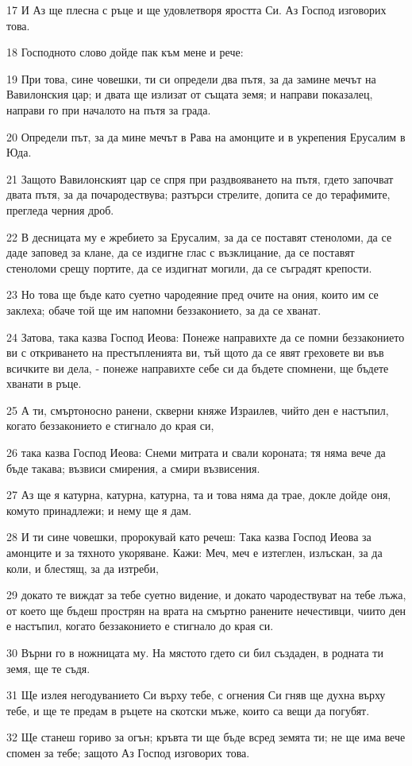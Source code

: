 \par 17 И Аз ще плесна с ръце и ще удовлетворя яростта Си. Аз Господ изговорих това.
\par 18 Господното слово дойде пак към мене и рече:
\par 19 При това, сине човешки, ти си определи два пътя, за да замине мечът на Вавилонския цар; и двата ще излизат от същата земя; и направи показалец, направи го при началото на пътя за града.
\par 20 Определи път, за да мине мечът в Рава на амонците и в укрепения Ерусалим в Юда.
\par 21 Защото Вавилонският цар се спря при раздвояването на пътя, гдето започват двата пътя, за да почародествува; разтърси стрелите, допита се до терафимите, прегледа черния дроб.
\par 22 В десницата му е жребието за Ерусалим, за да се поставят стеноломи, да се даде заповед за клане, да се издигне глас с възклицание, да се поставят стеноломи срещу портите, да се издигнат могили, да се съградят крепости.
\par 23 Но това ще бъде като суетно чародеяние пред очите на ония, които им се заклеха; обаче той ще им напомни беззаконието, за да се хванат.
\par 24 Затова, така казва Господ Иеова: Понеже направихте да се помни беззаконието ви с откриването на престъпленията ви, тъй щото да се явят греховете ви във всичките ви дела, - понеже направихте себе си да бъдете спомнени, ще бъдете хванати в ръце.
\par 25 А ти, смъртоносно ранени, скверни княже Израилев, чийто ден е настъпил, когато беззаконието е стигнало до края си,
\par 26 така казва Господ Иеова: Снеми митрата и свали короната; тя няма вече да бъде такава; възвиси смирения, а смири възвисения.
\par 27 Аз ще я катурна, катурна, катурна, та и това няма да трае, докле дойде оня, комуто принадлежи; и нему ще я дам.
\par 28 И ти сине човешки, пророкувай като речеш: Така казва Господ Иеова за амонците и за тяхното укоряване. Кажи: Меч, меч е изтеглен, излъскан, за да коли, и блестящ, за да изтреби,
\par 29 докато те виждат за тебе суетно видение, и докато чародествуват на тебе лъжа, от което ще бъдеш прострян на врата на смъртно ранените нечестивци, чиито ден е настъпил, когато беззаконието е стигнало до края си.
\par 30 Върни го в ножницата му. На мястото гдето си бил създаден, в родната ти земя, ще те съдя.
\par 31 Ще излея негодуванието Си върху тебе, с огнения Си гняв ще духна върху тебе, и ще те предам в ръцете на скотски мъже, които са вещи да погубят.
\par 32 Ще станеш гориво за огън; кръвта ти ще бъде всред земята ти; не ще има вече спомен за тебе; защото Аз Господ изговорих това.

